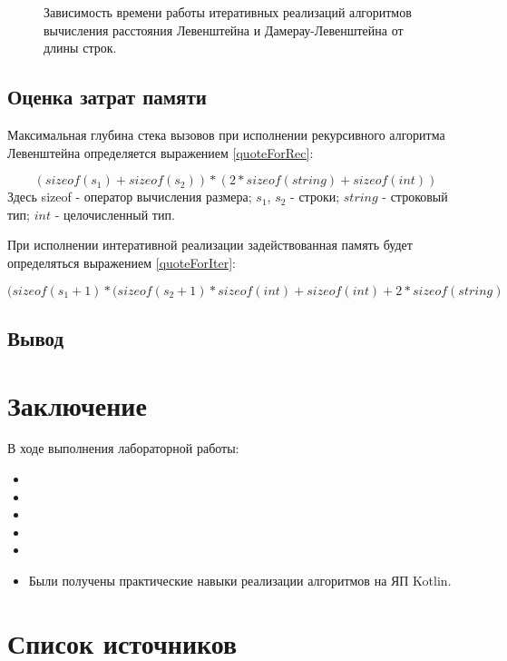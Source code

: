 \documentclass[12pt]{report}
\begin{document}
\begin{figure}[h]
	\begin{center}
	\captionsetup{justification=centering}
	\caption{Зависимость времени работы итеративных реализаций алгоритмов вычисления расстояния Левенштейна и Дамерау-Левенштейна от длины строк.}
	\label{IterTime}
	\end{center}
\end{figure}

\section{Оценка затрат памяти}
Максимальная глубина стека вызовов при исполнении рекурсивного алгоритма Левенштейна определяется выражением \ref{quoteForRec}:

\begin{equation}
\label{quoteForRec}
(sizeof(s_{1}) + sizeof(s_{2})) * (2 * sizeof(string) + sizeof(int))
\end{equation}
Здесь sizeof - оператор вычисления размера; $s_{1}$, $s_{2}$ - строки; $string$ - строковый тип; $int$ - целочисленный тип.

При исполнении интеративной реализации задействованная память будет определяться выражением \ref{quoteForIter}:

\begin{equation}
\label{quoteForIter}
(sizeof(s_{1} + 1) * (sizeof(s_{2} + 1) * sizeof(int) + sizeof(int) + 2 * sizeof(string)
\end{equation}

\section*{Вывод}

\chapter*{Заключение}
В ходе выполнения лабораторной работы:
\begin{itemize}
\item 
\item 
\item 
\item 
\item 
\item Были получены практические навыки реализации алгоритмов на ЯП Kotlin.
\end{itemize}

\chapter*{Список источников}
\end{document}
